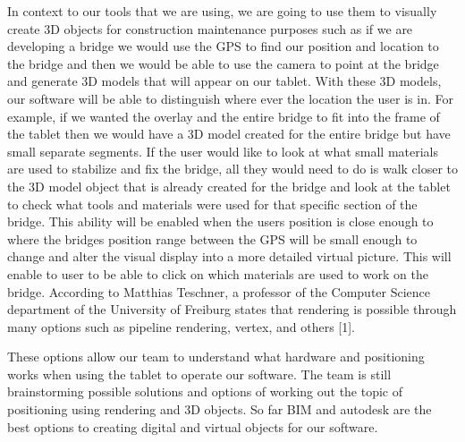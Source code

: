 \documentclass[a4paper, 11pt]{article} %
\begin{document}
In context to our tools that we are using, we are going to use them to visually create 3D objects for construction maintenance purposes such as if we are developing a bridge we would use the GPS to find our position and location to the bridge and then we would be able to use the camera to point at the bridge and generate 3D models that will appear on our tablet. With these 3D models, our software will be able to distinguish where ever the location the user is in. For example, if we wanted the overlay and the entire bridge to fit into the frame of the tablet then we would have a 3D model created for the entire bridge but have small separate segments. If the user would like to look at what small materials are used to stabilize and fix the bridge, all they would need to do is walk closer to the 3D model object that is already created for the bridge and look at the tablet to check what tools and materials were used for that specific section of the bridge. This ability will be enabled when the users position is close enough to where the bridges position range between the GPS will be small enough to change and alter the visual display into a more detailed virtual picture. This will enable to user to be able to click on which materials are used to work on the bridge. According to Matthias Teschner, a professor of the Computer Science department of the University of Freiburg states that rendering is possible through many options such as pipeline rendering, vertex, and others [1].

These options allow our team to understand what hardware and positioning works when using the tablet to operate our software. The team is still brainstorming possible solutions and options of working out the topic of positioning using rendering and 3D objects. So far BIM and autodesk are the best options to creating digital and virtual objects for our software.


\end{document}
